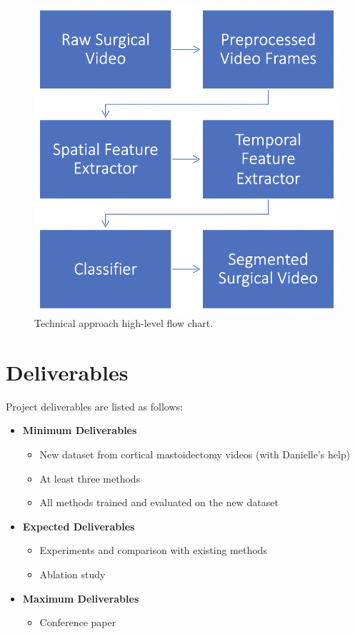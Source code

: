\documentclass[11pt]{article} \usepackage[top=1in, bottom=1in, left=1in, right=1in]{geometry}
\begin{document}
\begin{figure}[H]
    \includegraphics[scale=0.3]{Flow.png}
    \centering
    \caption{Technical approach high-level flow chart.}
    \label{fig:Flow}
\end{figure}


\section{Deliverables}
Project deliverables are listed as follows:
\begin{itemize}
    \item \textbf{Minimum Deliverables}
    \begin{itemize}
        \item New dataset from cortical mastoidectomy videos (with Danielle's help)
        \item At least three methods
        \item All methods trained and evaluated on the new dataset
    \end{itemize}
    \item \textbf{Expected Deliverables}
    \begin{itemize}
        \item Experiments and comparison with existing methods
        \item Ablation study
    \end{itemize}
    \item \textbf{Maximum Deliverables}
    \begin{itemize}
        \item Conference paper
    \end{itemize}
\end{itemize}
\end{document}
